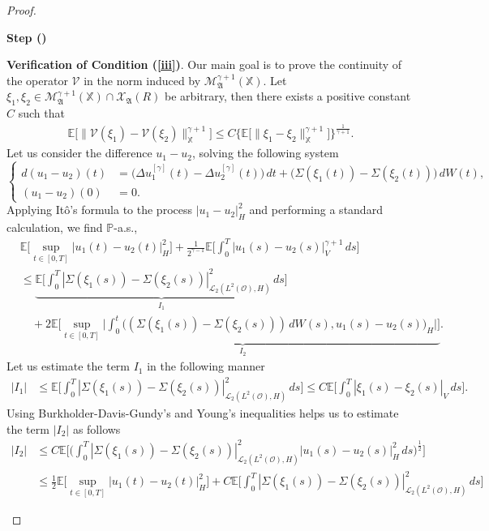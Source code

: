 \documentclass[english,a4paper,11pt]{amsart}
\theoremstyle{plain}
\theoremstyle{definition}
\theoremstyle{remark}
\numberwithin{equation}{section}
\newcounter{lil1}
\newenvironment{step}
{\begin{list} { \bf Step (\Roman{lil1})}
		{ \usecounter{lil1}
			\setlength{\leftmargin}{0.0cm}
			\setlength{\topsep}{0.2cm}
			\setlength{\itemsep}{0.0cm}
			\setlength{\parsep}{0.1cm}
			\setlength{\itemindent}{0.8cm}
			\setlength{\parskip}{0.0cm}}}
	{\end{list}}
\newcounter{lil33}
\newcounter{lil1q}
\newcommand{\CO}{{{ \mathcal O }}}
\newcommand{\EE}{ \mathbb{E} }
\newcommand{\Mcal} {{\mathcal M}}
\newcommand{\Vcal} {{\mathcal V}}
\newcommand{\Xcal} {{\mathcal X}}
\newcommand{\Afrak} {{\mathfrak A}}
\renewcommand{\P}{\mathbb{P}}
\newcommand{\X}{\mathbb{X}}
\begin{document}
\begin{proof}
\begin{step}
\item 
\textbf{Verification of Condition (\ref{iii})}. 
Our main goal is to prove the continuity of the operator $\Vcal$ in the norm induced by $\Mcal_\Afrak^{\gamma+1}(\X)$. Let $\xi_1,\xi_2\in \Mcal_\Afrak^{\gamma+1}(\X)\cap\Xcal_\Afrak(R)$ be arbitrary, then there exists a positive constant $C$ such that 
\begin{align*}
	\EE\big[\|\Vcal(\xi_1)-\Vcal(\xi_2)\|_\X ^{\gamma+1}\big] \leq C\Big\{\EE\big[\|\xi_1-\xi_2\|_\X^{\gamma+1}\big]\Big\}^\frac{1}{\gamma+1}.
\end{align*}
Let us consider the difference $u_1-u_2$, solving the following system 
\begin{equation*}
	\left\{
	\begin{aligned}
		d ( u_1-u_2)(t)&= \big(\Delta u_1^{[\gamma]}(t)-\Delta u_2^{[\gamma]}(t)\big)\, dt+\big(\Sigma(\xi_1(t))-\Sigma(\xi_2(t))\big)\, dW(t), \\
		(u_1-u_2)(0)&=0.
	\end{aligned}
	\right.
\end{equation*}Applying It\^o's formula to the process $|u_1-u_2|_H^2$ and performing a standard calculation, we find $\P$-a.s.,
\begin{align}\label{EG2}\nonumber
	&\EE\bigg[\sup_{t\in[0,T]} | u_1(t)-u_2(t) | _H^2\bigg]+\frac{1}{2^{\gamma-1}}\EE\bigg[ \int_0^T | u_1(s)-u_2(s) | _V^{\gamma+1}\,ds \bigg]
	\\&\nonumber
	\leq  \underbrace{\EE\bigg[\int_0^T | \Sigma(\xi_1(s))-\Sigma(\xi_2(s)) | _{\mathcal{L}_2(L^2(\CO),H)}^2\,ds\bigg]}_{I_1} \\&\quad +\underbrace{2\EE\bigg[\sup_{t\in[0,T]}\bigg|\int_0^t\big((\Sigma(\xi_1(s))-\Sigma(\xi_2(s)))\, dW(s), u_1(s)-u_2(s)\big)_H \bigg|\bigg]}_{I_2}. 
\end{align}Let us estimate the term $I_1$ in the following manner
\begin{align*}
	|I_1| &\leq \EE\bigg[\int_0^T | \Sigma(\xi_1(s))-\Sigma({\xi_2(s)}) | _{\mathcal{L}_2(L^2(\CO),H)}^2\,ds\bigg] \leq C \EE\bigg[\int_0^T  | \xi_1(s)-\xi_2(s) | _V\,ds \bigg].
\end{align*}Using Burkholder-Davis-Gundy's and Young's inequalities helps us to estimate the term $|I_2|$ as follows
\begin{align*}
	|I_2| &\leq C \EE\bigg[\bigg(\int_0^T | \Sigma({\xi_1(s)})-\Sigma({\xi_2(s)}) | _{\mathcal{L}_2(L^2(\CO),H)}^2 | u_1(s)-u_2(s) | _H^2\,ds \bigg)^\frac{1}{2}\bigg]
	\\&\leq 
	\frac{1}{2}\EE\bigg[\sup_{t\in[0,T]} | u_1(t)-u_2(t) | _H^2\bigg]+C\EE\bigg[\int_0^T | \Sigma({\xi_1(s)})-\Sigma({\xi_2(s)}) | _{\mathcal{L}_2(L^2(\CO),H)}^2\,ds\bigg] 

\end{align*}
\end{step}
\end{proof}
\end{document}
